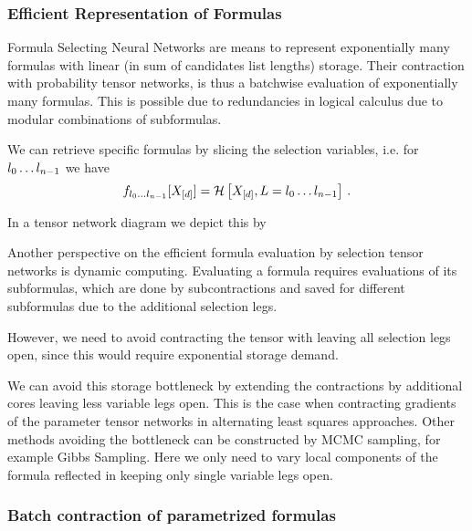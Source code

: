 \subsubsection{Efficient Representation of Formulas}


Formula Selecting Neural Networks are means to represent exponentially many formulas with linear (in sum of candidates list lengths) storage.
Their contraction with probability tensor networks, is thus a batchwise evaluation of exponentially many formulas.
This is possible due to redundancies in logical calculus due to modular combinations of subformulas.

We can retrieve specific formulas by slicing the selection variables, i.e. for $l_{0}\ldots l_{n-1}$ we have
	\[ f_{l_{0}\ldots l_{n-1}}[X_{[d]}] = \mathcal{H}\left[X_{[d]},L=l_{0}\ldots l_{n-1}\right] \, .  \]

In a tensor network diagram we depict this by
\begin{center}
	
\end{center}

Another perspective on the efficient formula evaluation by selection tensor networks is dynamic computing.
Evaluating a formula requires evaluations of its subformulas, which are done by subcontractions and saved for different subformulas due to the additional selection legs.

However, we need to avoid contracting the tensor with leaving all selection legs open, since this would require exponential storage demand.

We can avoid this storage bottleneck by extending the contractions by additional cores leaving less variable legs open.
This is the case when contracting gradients of the parameter tensor networks in alternating least squares approaches.
Other methods avoiding the bottleneck can be constructed by MCMC sampling, for example Gibbs Sampling.
Here we only need to vary local components of the formula reflected in keeping only single variable legs open.



\subsubsection{Batch contraction of parametrized formulas}

